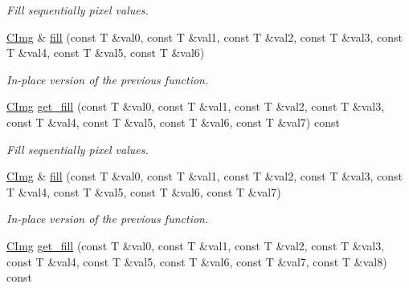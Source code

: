 \begin{DoxyCompactItemize}
\begin{DoxyCompactList}\small\item\em Fill sequentially pixel values. \end{DoxyCompactList}\item 
\hypertarget{structcimg__library_1_1_c_img_aae9c53b0947eb5ed2d948d28b2de6a6e}{\hyperlink{structcimg__library_1_1_c_img}{C\-Img} \& \hyperlink{structcimg__library_1_1_c_img_aae9c53b0947eb5ed2d948d28b2de6a6e}{fill} (const T \&val0, const T \&val1, const T \&val2, const T \&val3, const T \&val4, const T \&val5, const T \&val6)}\label{structcimg__library_1_1_c_img_aae9c53b0947eb5ed2d948d28b2de6a6e}

\begin{DoxyCompactList}\small\item\em In-\/place version of the previous function. \end{DoxyCompactList}\item 
\hypertarget{structcimg__library_1_1_c_img_a61f7b8db6e6adb67d5df15f50fba528d}{\hyperlink{structcimg__library_1_1_c_img}{C\-Img} \hyperlink{structcimg__library_1_1_c_img_a61f7b8db6e6adb67d5df15f50fba528d}{get\-\_\-fill} (const T \&val0, const T \&val1, const T \&val2, const T \&val3, const T \&val4, const T \&val5, const T \&val6, const T \&val7) const }\label{structcimg__library_1_1_c_img_a61f7b8db6e6adb67d5df15f50fba528d}

\begin{DoxyCompactList}\small\item\em Fill sequentially pixel values. \end{DoxyCompactList}\item 
\hypertarget{structcimg__library_1_1_c_img_ac804653aeaa4de7f445dd0c9454d28c1}{\hyperlink{structcimg__library_1_1_c_img}{C\-Img} \& \hyperlink{structcimg__library_1_1_c_img_ac804653aeaa4de7f445dd0c9454d28c1}{fill} (const T \&val0, const T \&val1, const T \&val2, const T \&val3, const T \&val4, const T \&val5, const T \&val6, const T \&val7)}\label{structcimg__library_1_1_c_img_ac804653aeaa4de7f445dd0c9454d28c1}

\begin{DoxyCompactList}\small\item\em In-\/place version of the previous function. \end{DoxyCompactList}\item 
\hypertarget{structcimg__library_1_1_c_img_ab06a2c7a08e59e21f745d2e3862364c2}{\hyperlink{structcimg__library_1_1_c_img}{C\-Img} \hyperlink{structcimg__library_1_1_c_img_ab06a2c7a08e59e21f745d2e3862364c2}{get\-\_\-fill} (const T \&val0, const T \&val1, const T \&val2, const T \&val3, const T \&val4, const T \&val5, const T \&val6, const T \&val7, const T \&val8) const }\label{structcimg__library_1_1_c_img_ab06a2c7a08e59e21f745d2e3862364c2}


\end{DoxyCompactItemize}
